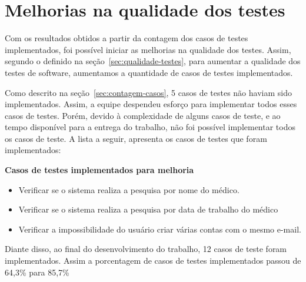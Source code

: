 \section{Melhorias na qualidade dos testes}
Com os resultados obtidos a partir da contagem dos casos de testes implementados, foi possível iniciar as melhorias na qualidade dos testes. Assim, segundo o definido na seção~\ref{sec:qualidade-testes}, para aumentar a qualidade dos testes de software, aumentamos a quantidade de casos de testes implementados.

Como descrito na seção~\ref{sec:contagem-casos}, 5 casos de testes não haviam sido implementados. Assim, a equipe despendeu esforço para implementar todos esses casos de testes. Porém, devido à complexidade de alguns casos de teste, e ao tempo disponível para a entrega do trabalho, não foi possível implementar todos os casos de teste. A lista a seguir, apresenta os casos de testes que foram implementados: 

\textbf{Casos de testes implementados para melhoria}
\begin{itemize}
	\item Verificar se o sistema realiza a pesquisa por nome do médico.
	\item Verificar se o sistema realiza a pesquisa por data de trabalho do médico
	\item Verificar a impossibilidade do usuário criar várias contas com o mesmo e-mail. 
\end{itemize}

Diante disso, ao final do desenvolvimento do trabalho, 12 casos de teste foram implementados. Assim a porcentagem de casos de testes implementados passou de 64,3\% para 85,7\%

